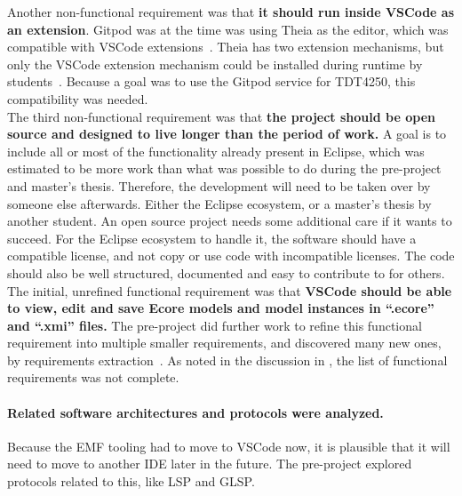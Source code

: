 Another non-functional requirement was that \textbf{it should run inside \gls{VSCode} as an extension}.
Gitpod was at the time was using \gls{Theia} as the editor, which was compatible with \gls{VSCode} extensions~\cite{rekstadModelingEnvironmentCloud2020}.
\Gls{Theia} has two extension mechanisms, but only the \gls{VSCode} extension mechanism could be installed during runtime by students~\cite{rekstadModelingEnvironmentCloud2020}.
Because a goal was to use the Gitpod service for \gls{TDT4250}, this compatibility was needed.\\

The third non-functional requirement was that \textbf{the project should be \gls{open source} and designed to live longer than the period of work.}
A goal is to include all or most of the functionality already present in \gls{Eclipse}, which was estimated to be more work than what was possible to do during the pre-project and master's thesis.
Therefore, the development will need to be taken over by someone else afterwards.
Either the Eclipse ecosystem, or a master's thesis by another student.
An \gls{open source} project needs some additional care if it wants to succeed.
For the Eclipse ecosystem to handle it, the software should have a compatible license, and not copy or use code with incompatible licenses.
The code should also be well structured, documented and easy to contribute to for others.\\

The initial, unrefined functional requirement was that \textbf{\gls{VSCode} should be able to view, edit and save \gls{Ecore} models and model instances in ``.ecore'' and ``.xmi'' files.}
The pre-project did further work to refine this functional requirement into multiple smaller requirements, and discovered many new ones, by requirements extraction~\cite[p.~47,48]{rekstadModelingEnvironmentCloud2020}.
As noted in the discussion in \cite[p.~51]{rekstadModelingEnvironmentCloud2020}, the list of functional requirements was not complete.


\paragraph{Related software architectures and protocols were analyzed.}
Because the \acrshort{EMF} tooling had to move to \gls{VSCode} now, it is plausible that it will need to move to another \acrshort{IDE} later in the future.
The pre-project explored protocols related to this, like \acrfull{LSP} and \acrfull{GLSP}.


